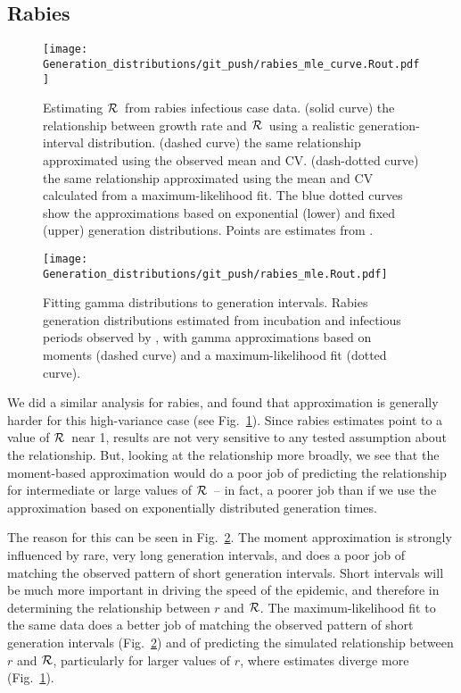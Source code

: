 \documentclass[12pt,]{article}
\newcommand{\RR}{\ensuremath{{\cal R}}}
\newcommand{\fref}[1]{Fig.~\ref{fig:#1}}
\begin{document}
\subsection{Rabies}

\begin{figure}[htbp] \centering
	\texttt{[image: Generation\_distributions/git\_push/rabies\_mle\_curve.Rout.pdf]}
	\caption{Estimating \RR~from rabies infectious case data.
		(solid curve) the relationship between growth rate and \RR~using a realistic generation-interval distribution.
		(dashed curve) the same relationship approximated using the observed mean and CV.
		(dash-dotted curve) the same relationship approximated using the mean and CV calculated from a maximum-likelihood fit.
		The blue dotted curves show the approximations based on exponential (lower) and fixed (upper) generation distributions.
		Points are estimates from \cite{HampDush09}.
	}
	\label{fig:rabiesCurve}
\end{figure}

\begin{figure}[htbp] \centering
	\texttt{[image: Generation\_distributions/git\_push/rabies\_mle.Rout.pdf]}
	\caption{
		Fitting gamma distributions to generation intervals. 
		Rabies generation distributions estimated from incubation and infectious periods observed by \cite{HampDush09}, with gamma approximations based on moments (dashed curve) and a maximum-likelihood fit (dotted curve).
	}
	\label{fig:rabiesHist}
\end{figure}

We did a similar analysis for rabies, and found that approximation is generally harder for this high-variance case (see \fref{rabiesCurve}). Since rabies estimates point to a value of \RR\ near 1, results are not very sensitive to any tested assumption about the relationship. But, looking at the relationship more broadly, we see that the moment-based approximation would do a poor job of predicting the relationship for intermediate or large values of \RR\ -- in fact, a poorer job than if we use the approximation based on exponentially distributed generation times. 

The reason for this can be seen in \fref{rabiesHist}. The moment approximation is strongly influenced by rare, very long generation intervals, and does a poor job of matching the observed pattern of short generation intervals. Short intervals will be much more important in driving the speed of the epidemic, and therefore in determining the relationship between $r$ and \RR. The maximum-likelihood fit to the same data does a better job of matching the observed pattern of short generation intervals (\fref{rabiesHist}) and of predicting the simulated relationship between $r$ and \RR, particularly for larger values of $r$, where estimates diverge more (\fref{rabiesCurve}).
\end{document}
